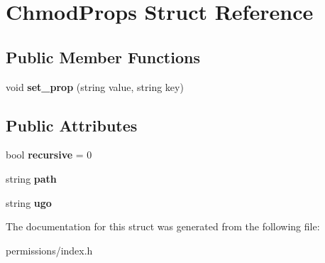 \hypertarget{structChmodProps}{}\section{Chmod\+Props Struct Reference}
\label{structChmodProps}
\subsection*{Public Member Functions}
\begin{DoxyCompactItemize}
\item 
\mbox{\label{structChmodProps_a08772639aee06f98492670051a86fe9b}} 
void {\bfseries set\+\_\+prop} (string value, string key)
\end{DoxyCompactItemize}
\subsection*{Public Attributes}
\begin{DoxyCompactItemize}
\item 
\mbox{\label{structChmodProps_aecb787e1ca110239b753a6cc48c21c51}} 
bool {\bfseries recursive} = 0
\item 
\mbox{\label{structChmodProps_a21f3211be6f8a92b571fc97997144748}} 
string {\bfseries path}
\item 
\mbox{\label{structChmodProps_a9d4abcc6c05af2e100ea9eae2c5864d5}} 
string {\bfseries ugo}
\end{DoxyCompactItemize}


The documentation for this struct was generated from the following file\+:\begin{DoxyCompactItemize}
\item 
permissions/index.\+h\end{DoxyCompactItemize}
